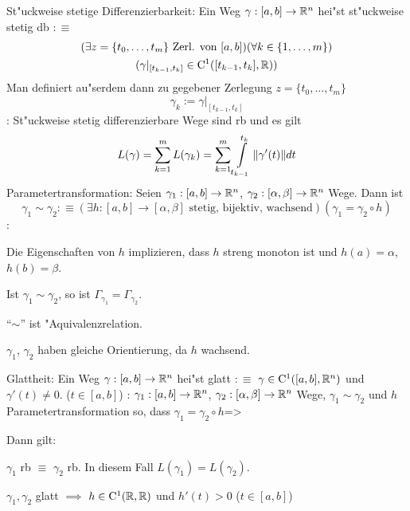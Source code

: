  St"uckweise stetige Differenzierbarkeit:{
  Ein Weg $\gamma:[a,b]\to\mathbb R^n$ hei"st st"uckweise stetig db $:\equiv$
  \begin{multline*}
    (\exists z=\{t_0,\ldots,t_m\} \text{ Zerl. von $[a,b]$})
    (\forall k\in\{1,\ldots,m\}) \\
    (\gamma|_{[t_{k-1},t_k]}\in{\rm C}^1([t_{k-1},t_k],\mathbb R))
  \end{multline*}
  Man definiert au"serdem dann  zu gegebener Zerlegung $z=\{t_0,\ldots,t_m\}$
  \[\gamma_k:=\gamma|_{[t_{k-1},t_k]}
    \] 
  }
\remark:{
  St"uckweise stetig differenzierbare Wege sind rb und es gilt
  \[L(\gamma)=\sum_{k=1}^m L(\gamma_k)=
    \sum_{k=1}^m \int_{t_{k-1}}^{t_k} \norm{\gamma'(t)} dt
    \]
  }
 Parametertransformation:{
  Seien $\gamma_1:[a,b]\to\mathbb R^n$, $\gamma_2:[\alpha,\beta]\to\mathbb R^n$ Wege.
  Dann ist 
  \[\gamma_1 \sim \gamma_2 :\equiv
    (\exists h:[a,b]\to[\alpha,\beta] \text{ stetig, bijektiv, wachsend})
    (\gamma_1=\gamma_2\circ h)
    \]
  }
\remark:{
  \begin{stmts}
    \item Die Eigenschaften von $h$ implizieren, dass $h$ streng monoton ist
      und $h(a)=\alpha$, $h(b)=\beta$.
    \item Ist $\gamma_1\sim\gamma_2$, so ist $\Gamma_{\gamma_1}=\Gamma_{\gamma_2}$.
    \item ``$\sim$'' ist "Aquivalenzrelation.
    \item $\gamma_1$, $\gamma_2$ haben gleiche Orientierung, da $h$ wachsend.
    \end{stmts}
  }
 Glattheit:{
  Ein Weg $\gamma:[a,b]\to\mathbb R^n$ hei"st glatt $:\equiv$ 
  $\gamma\in{\rm C}^1([a,b],\mathbb R^n)$ und $\gamma'(t)\neq 0$. ($t\in[a,b]$)
  }
\theorem:
  $\gamma_1:[a,b]\to\mathbb R^n$, $\gamma_2:[\alpha,\beta]\to\mathbb R^n$ Wege,
  $\gamma_1\sim\gamma_2$ und $h$ Parametertransformation so, dass
  $\gamma_1=\gamma_2\circ h$=>{
  Dann gilt:
  \begin{stmts}
    \item $\gamma_1$ rb $\equiv$ $\gamma_2$ rb. 
      In diesem Fall $L(\gamma_1)=L(\gamma_2)$.
    \item $\gamma_1,\gamma_2$ glatt $\implies$ $h\in{\rm C}^1(\mathbb R,\mathbb R)$ 
      und $h'(t)>0$ ($t\in[a,b]$)
    \end{stmts}
  }
